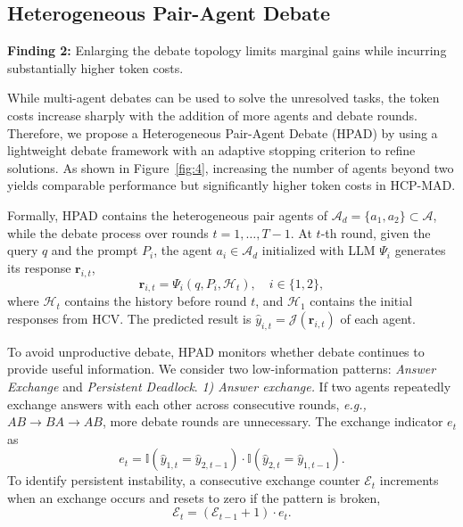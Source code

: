 \documentclass[11pt]{article}
\begin{document}
\subsection{Heterogeneous Pair-Agent Debate}
\begin{tcolorbox}[
    colframe=green!40!black,
    colback=white,
    boxrule=0.7pt,
    arc=2pt,
    boxsep=0pt,
    left=5pt,
    right=5pt,
    top=2pt,
    bottom=2pt,
    before skip=3pt,
    after skip=6pt
]
\noindent\textbf{\textcolor{green!40!black}{Finding 2:}}
Enlarging the debate topology limits marginal gains while incurring substantially higher token costs.
\end{tcolorbox}
While multi-agent debates can be used to solve the unresolved tasks, the token costs increase sharply with the addition of more agents and debate rounds. 
Therefore, we propose a Heterogeneous Pair-Agent Debate (HPAD) by using a lightweight debate framework with an adaptive stopping criterion to refine solutions. 
As shown in Figure~\ref{fig:4}, increasing the number of agents beyond two yields comparable performance but significantly higher token costs in HCP-MAD.

Formally, HPAD contains the heterogeneous pair agents of $\mathcal{A}_{d} = \{a_1, a_2\} \subset \mathcal{A}$, while the debate process over rounds \(t=1,\ldots,T-1\). 
At $t$-th round, given the query $q$ and the prompt $P_i$, the agent $a_i \in \mathcal{A}_{d}$  initialized with LLM $\Psi_i$ generates its response $\boldsymbol{r}_{i,t}$,
\begin{equation}
    \boldsymbol{r}_{i,t} = \Psi_i(q, P_i, \mathcal{H}_{t}), %
    \quad i \in \{1, 2\},
\end{equation}
where \(\mathcal{H}_t\) contains the history before round \(t\), and \(\mathcal{H}_1\) contains the initial
responses from HCV.
The predicted result is $\hat{y}_{i,t}= \mathcal{J}(\boldsymbol{r}_{i,t})$ of each agent.

To avoid unproductive debate, HPAD monitors whether debate continues to provide useful information. 
We consider two low-information patterns: \emph{Answer Exchange} and \emph{Persistent Deadlock}.
\emph{1) Answer exchange.}
If two agents repeatedly exchange answers with each other across consecutive rounds, \emph{e.g.,} $AB\!\rightarrow\!BA\!\rightarrow\!AB$, more debate rounds are unnecessary. The exchange indicator  $e_t$ as
\begin{equation}
e_t
=
\mathbb{I}\!\left(\hat{y}_{1,t}=\hat{y}_{2,t-1}\right)
\cdot
\mathbb{I}\!\left(\hat{y}_{2,t}=\hat{y}_{1,t-1}\right). %
\label{eq:swap-indicator}
\end{equation}
To identify persistent instability, a consecutive exchange counter $\mathcal{E}_t$ increments when an exchange occurs and resets to zero if the pattern is broken,
\begin{equation}
\mathcal{E}_t =  (\mathcal{E}_{t-1} + 1)\cdot e_t .
\label{eq:consecutive-exchange}
\end{equation}
\end{document}
